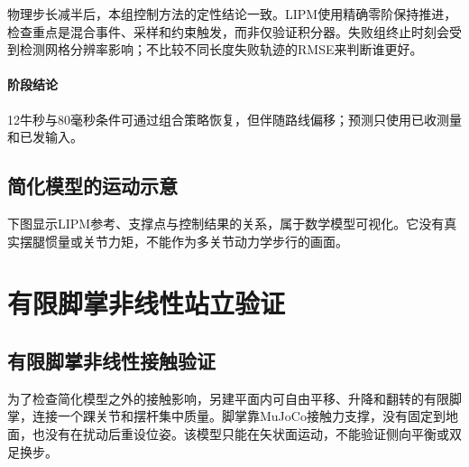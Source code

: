 物理步长减半后，本组控制方法的定性结论一致。LIPM使用精确零阶保持推进，检查重点是混合事件、采样和约束触发，而非仅验证积分器。失败组终止时刻会受到检测网格分辨率影响；不比较不同长度失败轨迹的RMSE来判断谁更好。


\paragraph{阶段结论}12牛秒与80毫秒条件可通过组合策略恢复，但伴随路线偏移；预测只使用已收测量和已发输入。



\subsection{简化模型的运动示意}
下图显示LIPM参考、支撑点与控制结果的关系，属于数学模型可视化。它没有真实摆腿惯量或关节力矩，不能作为多关节动力学步行的画面。



\FloatBarrier

\section{有限脚掌非线性站立验证}

\label{stage:s19}

\subsection{有限脚掌非线性接触验证}\label{s19-detail-1}

为了检查简化模型之外的接触影响，另建平面内可自由平移、升降和翻转的有限脚掌，连接一个踝关节和摆杆集中质量。脚掌靠MuJoCo接触力支撑，没有固定到地面，也没有在扰动后重设位姿。该模型只能在矢状面运动，不能验证侧向平衡或双足换步。

